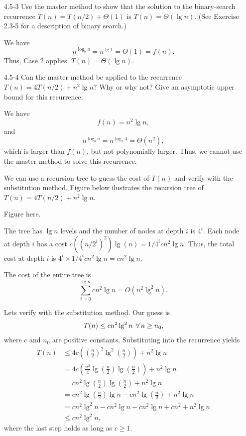 \begin{enumerate}
\item[4.5{-}3]{Use the master method to show that the solution to the
binary-search recurrence $T(n) = T(n/2) + \Theta(1)$ is $T(n) = \Theta(\lg n)$.
(See Exercise 2.3-5 for a description of binary search.)}

\begin{framed}
We have
\[
n^{\log_b a} = n^{\lg 1} = \Theta(1) = f(n).
\]
Thus, Case 2 applies. $T(n) = \Theta(\lg n)$.
\end{framed}

\newpage

\item[4.5{-}4]{Can the master method be applied to the recurrence
$T(n) = 4 T(n/2) + n^2 \lg n$? Why or why not? Give an asymptotic upper bound
for this recurrence.}

\begin{framed}
We have
\[
  f(n) = n^2 \lg n,
\]
and
\[
n^{\log_b a} = n^{\log_2 4} = \Theta(n^2),
\]
which is larger than $f(n)$, but not polynomially larger. Thus, we cannot use the
master method to solve this recurrence.

We can use a recursion tree to guess the cost of $T(n)$ and verify with the
substitution method. Figure below ilustrates the recursion tree of
$T(n) = 4 T(n/2) + n^2 \lg n$.

\begin{center} Figure here. \end{center}

The tree has $\lg n$ levels and the number of nodes at depth $i$ is $4^i$. Each
node at depth $i$ has a cost $c((n/2^i)^2) \lg(n) = 1/4^i c n^2 \lg n$. Thus,
the total cost at depth $i$ is $4^i \times 1/4^i c n^2 \lg n = c n^2 \lg n$.

The cost of the entire tree is
\[
  \sum_{i = 0}^{\lg n} c n^2 \lg n = O(n^2 \lg^2 n).
\]

Lets verify with the substitution method. Our guess is
\[
T(n) \le cn^2\lg^2 n \; \operatorname{\forall} n \ge n_0,
\]
where $c$ and $n_0$ are positive constants. Substituting into the
recurrence yields
\begin{equation*}
\begin{aligned}
  T(n) &\le 4c \left(\left(\frac{n}{2}\right)^2 \lg^2{\left(\frac{n}{2}\right)}\right) + n^2 \lg n\\
       &=   4c \left(\frac{n^2}{4} \lg{\left(\frac{n}{2}\right)}\lg{\left(\frac{n}{2}\right)}\right) + n^2 \lg n\\
       &=   c n^2 \lg{\left(\frac{n}{2}\right)}\lg{\left(\frac{n}{2}\right)} + n^2 \lg n\\
       &=   c n^2 \lg{\left(\frac{n}{2}\right)}\lg n - c n^2 \lg{\left(\frac{n}{2}\right)} + n^2 \lg n\\
       &=   c n^2 \lg^2 n - c n^2 \lg n - c n^2 \lg n + c n^2 + n^2 \lg n\\
       &\le c n^2 \lg^2 n,
\end{aligned}
\end{equation*}
where the last step holds as long as $c \ge 1$.


\end{framed}
\end{enumerate}
